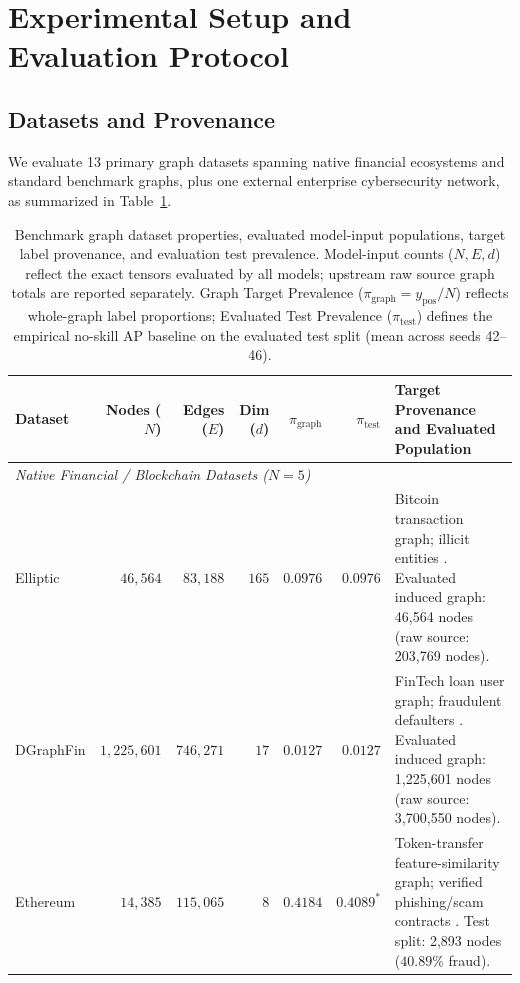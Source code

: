 \documentclass[applsci,article,submit,moreauthors,pdftex]{Definitions/mdpi}
\begin{document}
\section{Experimental Setup and Evaluation Protocol}
\label{sec:experimental_setup}

\subsection{Datasets and Provenance}
We evaluate 13 primary graph datasets spanning native financial ecosystems and standard benchmark graphs, plus one external enterprise cybersecurity network, as summarized in Table~\ref{tab:dataset_properties}.

\begin{table}[htbp]
\centering\fontsize{7.5pt}{8.8pt}\selectfont\setlength{\tabcolsep}{2.5pt}
\caption{Benchmark graph dataset properties, evaluated model-input populations, target label provenance, and evaluation test prevalence. Model-input counts ($N, E, d$) reflect the exact tensors evaluated by all models; upstream raw source graph totals are reported separately. Graph Target Prevalence ($\pi_{\mathrm{graph}} = y_{\mathrm{pos}} / N$) reflects whole-graph label proportions; Evaluated Test Prevalence ($\pi_{\mathrm{test}}$) defines the empirical no-skill AP baseline on the evaluated test split (mean across seeds 42--46).}
\label{tab:dataset_properties}
\begin{tabularx}{\textwidth}{lrrrrr>{\raggedright\arraybackslash}X}\toprule
\textbf{Dataset} & \textbf{Nodes ($N$)} & \textbf{Edges ($E$)} & \textbf{Dim ($d$)} & $\pi_{\mathrm{graph}}$ & $\pi_{\mathrm{test}}$ & \textbf{Target Provenance and Evaluated Population} \\\midrule
\multicolumn{7}{l}{\textit{Native Financial / Blockchain Datasets ($N=5$)}} \\
Elliptic & $46,564$ & $83,188$ & $165$ & $0.0976$ & $0.0976$ & Bitcoin transaction graph; illicit entities \cite{weber2019elliptic}. Evaluated induced graph: 46,564 nodes (raw source: 203,769 nodes). \\
DGraphFin & $1,225,601$ & $746,271$ & $17$ & $0.0127$ & $0.0127$ & FinTech loan user graph; fraudulent defaulters \cite{huang2022dgraph}. Evaluated induced graph: 1,225,601 nodes (raw source: 3,700,550 nodes). \\
Ethereum & $14,385$ & $115,065$ & $8$ & $0.4184$ & $0.4089^*$ & Token-transfer feature-similarity graph; verified phishing/scam contracts \cite{luo2024multichain}. Test split: 2,893 nodes ($40.89\%$ fraud). \\

\end{tabularx}
\end{table}
\end{document}
